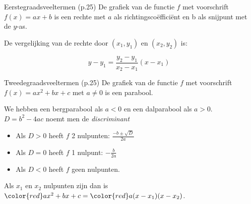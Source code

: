 \documentclass{beamer}
\theoremstyle{eigenschap}
\begin{document}
\begin{frame}{Eerstegraadsveeltermen (p.25)}
De grafiek van de functie $f$ met voorschrift $ f(x)= ax+b$ is een rechte met $a$ als richtingsco\"effici\"ent en b als snijpunt met de $y$-as.
	
	De vergelijking van de rechte door $(x_1,y_1)$ en $(x_2,y_2)$ is:
	
	$$
	y-y_1 = \frac{y_2-y_1}{x_2-x_1} (x-x_1)
	$$

\end{frame}	
\begin{frame}{Tweedegraadsveeltermen (p.25)}	
 De grafiek van de functie $f$ met voorschrift $ f(x)= ax^2+bx+c$ met
	$a\neq 0$ is een parabool.
	
	We hebben een bergparabool als $a<0$ en een dalparabool als $a>0$.
	\\
	
	$D=b^2-4ac$ noemt men de \emph{discriminant}
	\begin{itemize}
		\item Als $D > 0$ heeft $f$ 2 nulpunten:
		$\displaystyle{\frac{-b\pm \sqrt{D}}{2a}}$
		\item Als $D = 0$ heeft $f$ 1 nulpunt: $\displaystyle{-\frac{b}{2a}}$
		\item Als $D<0$ heeft $f$ geen nulpunten.
	\end{itemize}
	Als $x_1$ en $x_2$ nulpunten zijn dan is ${\color{red}a}x^2+bx+c = {\color{red}a}
	(x-x_1)(x-x_2)$.


\end{frame}
\end{document}
